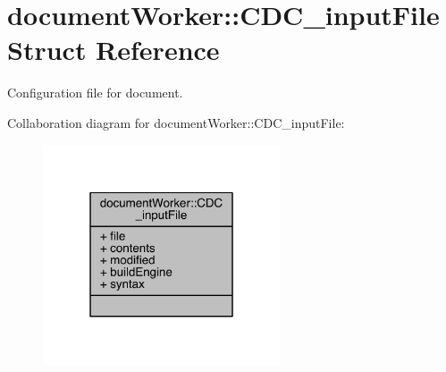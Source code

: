 \hypertarget{structdocument_worker_1_1_c_d_c__input_file}{\section{document\+Worker\+:\+:C\+D\+C\+\_\+input\+File Struct Reference}
\label{structdocument_worker_1_1_c_d_c__input_file}
}


Configuration file for document.  




Collaboration diagram for document\+Worker\+:\+:C\+D\+C\+\_\+input\+File\+:\nopagebreak
\begin{figure}[H]
\begin{center}
\leavevmode
\includegraphics[width=199pt]{structdocument_worker_1_1_c_d_c__input_file__coll__graph}
\end{center}
\end{figure}
